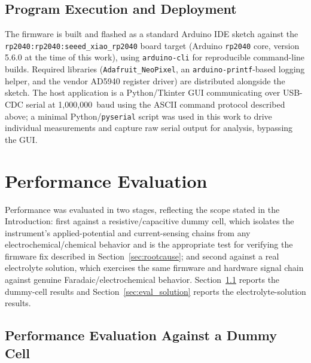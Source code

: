 \documentclass[preprint,12pt]{elsarticle}
\begin{document}
\subsection{Program Execution and Deployment}
The firmware is built and flashed as a standard Arduino IDE sketch against the \texttt{rp2040:rp2040:seeed\_xiao\_rp2040} board target (Arduino \texttt{rp2040} core, version 5.6.0 at the time of this work), using \texttt{arduino-cli} for reproducible command-line builds. Required libraries (\texttt{Adafruit\_NeoPixel}, an \texttt{arduino-printf}-based logging helper, and the vendor AD5940 register driver) are distributed alongside the sketch. The host application is a Python/Tkinter GUI communicating over USB-CDC serial at 1{,}000{,}000~baud using the ASCII command protocol described above; a minimal Python/\texttt{pyserial} script was used in this work to drive individual measurements and capture raw serial output for analysis, bypassing the GUI.

\section{Performance Evaluation}

Performance was evaluated in two stages, reflecting the scope stated in the Introduction: first against a resistive/capacitive dummy cell, which isolates the instrument's applied-potential and current-sensing chains from any electrochemical/chemical behavior and is the appropriate test for verifying the firmware fix described in Section~\ref{sec:rootcause}; and second against a real electrolyte solution, which exercises the same firmware and hardware signal chain against genuine Faradaic/electrochemical behavior. Section~\ref{sec:eval_dummy} reports the dummy-cell results and Section~\ref{sec:eval_solution} reports the electrolyte-solution results.

\subsection{Performance Evaluation Against a Dummy Cell}
\label{sec:eval_dummy}
\end{document}
